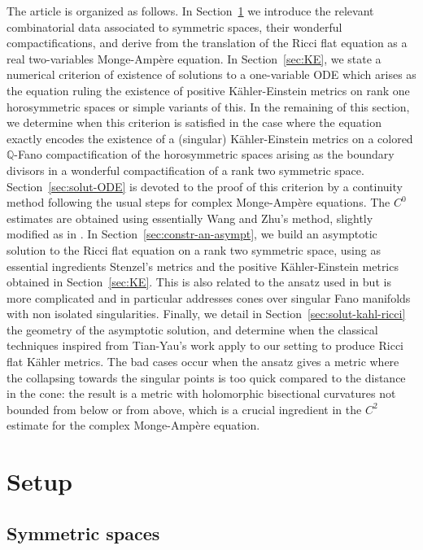 \documentclass[10pt]{amsart}
\theoremstyle{plain}
\theoremstyle{definition}
\begin{document}
The article is organized as follows. In Section~\ref{sec:setup} we
introduce the relevant combinatorial data associated to symmetric
spaces, their wonderful compactifications, and derive from
\cite{DelHoro} the translation of the Ricci flat equation as a real
two-variables Monge-Ampère equation. In Section~\ref{sec:KE}, we state
a numerical criterion of existence of solutions to a one-variable ODE
which arises as the equation ruling the existence of positive
Kähler-Einstein metrics on rank one horosymmetric spaces or simple
variants of this. In the remaining of this section, we determine when
this criterion is satisfied in the case where the equation exactly
encodes the existence of a (singular) Kähler-Einstein metrics on a
colored $\mathbb{Q}$-Fano compactification of the horosymmetric spaces
arising as the boundary divisors in a wonderful compactification of a
rank two symmetric space. Section~\ref{sec:solut-ODE} is devoted to
the proof of this criterion by a continuity method following the usual
steps for complex Monge-Ampère equations. The $C^0$ estimates are
obtained using essentially Wang and Zhu's method, slightly modified as
in \cite{DelKE}. In Section~\ref{sec:constr-an-asympt}, we build an
asymptotic solution to the Ricci flat equation on a rank two symmetric
space, using as essential ingredients Stenzel's metrics and the
positive Kähler-Einstein metrics obtained in
Section~\ref{sec:KE}. This is also related to the ansatz used in
\cite{CDR16,Li17,Sze17} but is more complicated and in particular
addresses cones over singular Fano manifolds with non isolated
singularities. Finally, we detail in
Section~\ref{sec:solut-kahl-ricci} the geometry of the asymptotic
solution, and determine when the classical techniques inspired from
Tian-Yau's work apply to our setting to produce Ricci flat Kähler
metrics. The bad cases occur when the ansatz gives a metric where the collapsing towards the singular points is too quick compared to the distance in the cone: the result is a metric with holomorphic bisectional curvatures not bounded from below or from above, which is a crucial ingredient in the $C^2$ estimate for the complex Monge-Ampère equation.


\section{Setup}
\label{sec:setup}

\subsection{Symmetric spaces}
\end{document}
